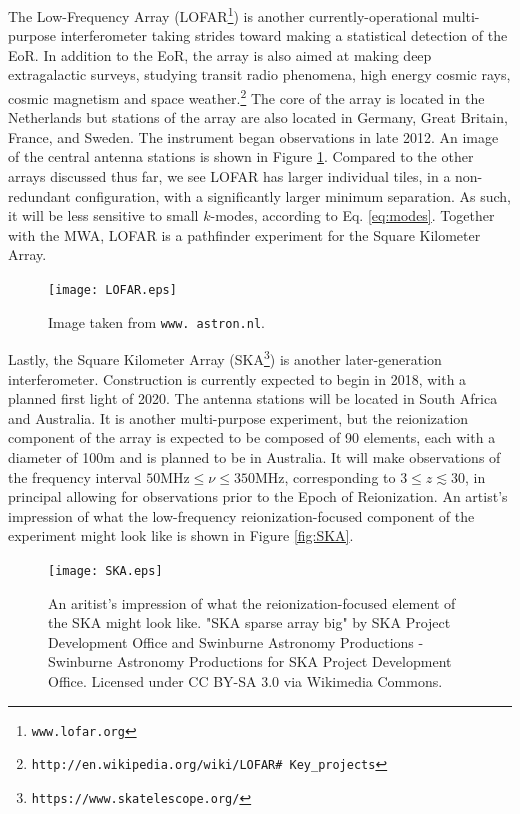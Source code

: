 The Low-Frequency Array (LOFAR\footnote{{\tt www.lofar.org}}) is another currently-operational multi-purpose interferometer taking strides toward making a statistical detection of the EoR. In addition to the EoR, the array is also aimed at making deep extragalactic surveys, studying transit radio phenomena, high energy cosmic rays, cosmic magnetism and space weather.\footnote{{\tt http://en.wikipedia.org/wiki/LOFAR\# Key\_projects}} The core of the array is located in the Netherlands but stations of the array are also located in Germany, Great Britain, France, and Sweden. The instrument began observations in late 2012. An image of the central antenna stations is shown in Figure \ref{fig:LOFAR}. Compared to the other arrays discussed thus far, we see LOFAR has larger individual tiles, in a non-redundant configuration, with a significantly larger minimum separation. As such, it will be less sensitive to small $k$-modes, according to Eq. \ref{eq:modes}. Together with the MWA, LOFAR is a pathfinder experiment for the Square Kilometer Array.


\begin{figure}[h]
  \centering
  \texttt{[image: LOFAR.eps]}
  \caption{Image taken from {\tt www. astron.nl}.}
  \label{fig:LOFAR}
\end{figure}


Lastly, the Square Kilometer Array (SKA\footnote{{\tt https://www.skatelescope.org/}}) is another later-generation interferometer. Construction is currently expected to begin in 2018, with a planned first light of 2020. The antenna stations will be located in South Africa and Australia. It is another multi-purpose experiment, but the reionization component of the array is expected to be composed of 90 elements, each with a diameter of 100m and is planned to be in Australia. It will make observations of the frequency interval $\text{50MHz} \leq \nu \leq 350\text{MHz}$, corresponding to $3 \leq z \lesssim 30$, in principal allowing for observations prior to the Epoch of Reionization. An artist's impression of what the low-frequency reionization-focused component of the experiment might look like is shown in Figure \ref{fig:SKA}.

\begin{figure}[h]
  \centering
  \texttt{[image: SKA.eps]}
  \caption{An aritist's impression of what the reionization-focused element of the SKA might look like. "SKA sparse array big" by SKA Project Development Office and Swinburne Astronomy Productions - Swinburne Astronomy Productions for SKA Project Development Office. Licensed under CC BY-SA 3.0 via Wikimedia Commons.}
  \label{fig:todo}
\end{figure}




